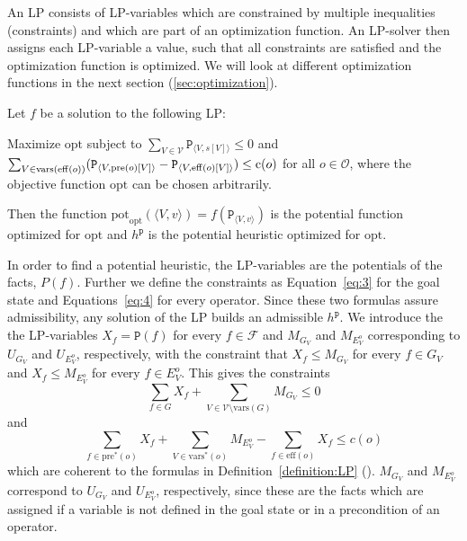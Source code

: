 An LP consists of LP-variables which are constrained by multiple inequalities (constraints) and which are part of an optimization function.
An LP-solver then assigns each LP-variable a value, such that all constraints are satisfied and the optimization function is optimized.
We will look at different optimization functions in the next section (\ref{sec:optimization}).

\begin{definition}
    \label{definition:LP}
    Let $f$ be a solution to the following LP:

    Maximize $\mathrm{opt}$ subject to $\sum_{V\in\mathcal{V}}\mathtt{P}_{\langle V, s[V]\rangle}\leq0$ and
    $\sum_{V\in\mathrm{vars(eff}(o))}(\mathtt{P}_{\langle V, \mathrm{pre}(o)[V]\rangle}-\mathtt{P}_{\langle V, \mathrm{eff}(o)[V]\rangle})\newline\leq\mathrm{c}(o)$
    for all $o\in\mathcal{O}$, where the objective function $\mathrm{opt}$ can be chosen arbitrarily.

    Then the function $\mathrm{pot}_{\mathrm{opt}}(\langle V,v\rangle)=f(\mathtt{P}_{\langle V,v\rangle})$ is the {\normalfont potential function optimized for $\mathrm{opt}$} and $h^{\mathtt{p}}$ is the {\normalfont potential heuristic optimized for $\mathrm{opt}$}.
\end{definition}

In order to find a potential heuristic, the LP-variables are the potentials of the facts, $P(f)$.
Further we define the constraints as Equation~\eqref{eq:3} for the goal state and Equations~\eqref{eq:4} for every operator.
Since these two formulas assure admissibility, any solution of the LP builds an admissible $h^\mathtt{p}$.
We introduce the the LP-variables $X_f=\mathtt{P}(f)$ for every $f\in\mathcal{F}$ and $M_{G_V}$ and $M_{E^o_V}$ corresponding to $U_{G_V}$ and $U_{E_V^o}$, respectively, with the constraint that $X_f\leq M_{G_V}$ for every $f\in G_V$ and $X_f\leq M_{E^o_V}$ for every $f\in E^o_V$.
This gives the constraints
\begin{equation}\sum_{f\in G}X_f+\sum_{V\in\mathcal{V}\setminus\text{vars}(G)}M_{G_V}\leq0\end{equation}
and
\begin{equation}\sum_{f\in\text{pre}^*(o)}X_f+\sum_{V\in\text{vars}^*(o)}M_{E^o_V}-\sum_{f\in\text{eff}(o)}X_f\leq c(o)\end{equation}
which are coherent to the formulas in Definition~\ref{definition:LP} (\citeauthor{pommerening2015non}).
$M_{G_V}$ and $M_{E^o_V}$ correspond to $U_{G_V}$ and $U_{E_V^o}$, respectively, since these are the facts which are assigned if a variable is not defined in the goal state or in a precondition of an operator.

